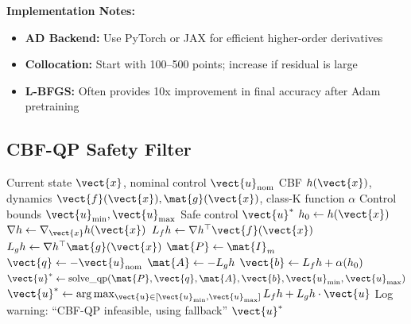 \textbf{Implementation Notes:}
\begin{itemize}
    \item \textbf{AD Backend:} Use PyTorch or JAX for efficient higher-order derivatives
    \item \textbf{Collocation:} Start with 100--500 points; increase if residual is large
    \item \textbf{L-BFGS:} Often provides 10x improvement in final accuracy after Adam pretraining
\end{itemize}

\subsection{CBF-QP Safety Filter}
\label{subsec:alg_cbf_qp}

\begin{algorithm}[H]
\caption{CBF-QP Safety Filter for Control-Affine Systems}
\label{alg:cbf_qp}
\begin{algorithmic}[1]
\REQUIRE Current state $\vect{x}$, nominal control $\vect{u}_{\text{nom}}$
\REQUIRE CBF $h(\vect{x})$, dynamics $\vect{f}(\vect{x}), \mat{g}(\vect{x})$, class-K function $\alpha$
\REQUIRE Control bounds $\vect{u}_{\min}, \vect{u}_{\max}$
\ENSURE Safe control $\vect{u}^*$
\STATE
\STATE {}
\STATE $h_0 \gets h(\vect{x})$
\STATE $\nabla h \gets \nabla_{\vect{x}} h(\vect{x})$ 
\STATE
\STATE {}
\STATE $L_f h \gets \nabla h^\top \vect{f}(\vect{x})$
\STATE $L_g h \gets \nabla h^\top \mat{g}(\vect{x})$ 
\STATE
\STATE {}
\STATE {}
\STATE {}
\STATE {}
\STATE
\STATE $\mat{P} \gets \mat{I}_m$ 
\STATE $\vect{q} \gets -\vect{u}_{\text{nom}}$ 
\STATE $\mat{A} \gets -L_g h$ 
\STATE $\vect{b} \gets L_f h + \alpha(h_0)$
\STATE
\STATE {}
\STATE $\vect{u}^* \gets \text{solve\_qp}(\mat{P}, \vect{q}, \mat{A}, \vect{b}, \vect{u}_{\min}, \vect{u}_{\max})$
\STATE
\STATE {}
    \STATE $\vect{u}^* \gets \arg\max_{\vect{u} \in [\vect{u}_{\min}, \vect{u}_{\max}]} L_f h + L_g h \cdot \vect{u}$ 
    \STATE Log warning: ``CBF-QP infeasible, using fallback''
\ENDIF
\RETURN $\vect{u}^*$
\end{algorithmic}
\end{algorithm}


